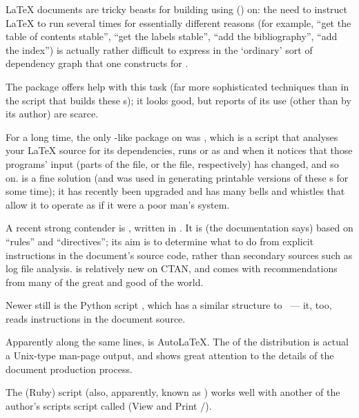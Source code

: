 
\LaTeX{} documents are tricky beasts for building using
()  on: the need to
instruct \LaTeX{} to run several times for essentially different
reasons (for example, ``get the table of contents stable'', ``get the
labels stable'', ``add the bibliography'', ``add the index'') is
actually rather difficult to express in the `ordinary' sort of
dependency graph that one constructs for .

The  package offers help with this task (far more
sophisticated techniques than in the script that builds these s); it
looks good, but reports of its use (other than by its author) are scarce.

For a long time, the only -like package on 
was , which is a 
script that analyses your \LaTeX{} source for its dependencies, runs
\BibTeX{} or  as and when it notices that those
programs' input (parts of the  file, or the
 file, respectively) has changed, and so on.
 is a fine 
solution (and was used in generating printable versions of these
s for some time); it has recently been upgraded and has
many bells and whistles that allow it to operate as if it were a poor
man's \WYSIWYG{} system.

A recent strong contender is , written in
.  It is (the documentation says) based on ``rules''
and ``directives''; its aim is to determine what to do from explicit
instructions in the document's source code, rather than secondary
sources such as log file analysis.   is relatively new
on CTAN, and comes with recommendations from many of the great and
good of the \latex{} world.

Newer still is the Python script , which has a similar
structure to ~--- it, too, reads instructions in the
document source.

Apparently along the same lines, is Auto\LaTeX{}.  The 
of the distribution is actual a Unix-type man-page output, and shows
great attention to the details of the document production process.

The (Ruby) script  (also, apparently, known as
) works well with another of the author's
scripts script called  (View and Print
\PS{}/).

